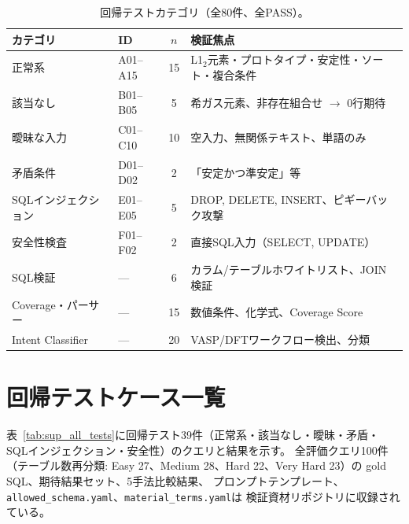 \documentclass[5p,twocolumn]{elsarticle}
\begin{document}
\begin{table}[htbp]
\centering
\caption{回帰テストカテゴリ（全80件、全PASS）。}
\label{tab:sup_test_categories}
\small
\begin{tabularx}{\textwidth}{llcX}
  \toprule
  カテゴリ & ID & $n$ & 検証焦点 \\
  \midrule
  正常系 & A01--A15 & 15 & L1$_2$元素・プロトタイプ・安定性・ソート・複合条件 \\
  該当なし & B01--B05 & 5 & 希ガス元素、非存在組合せ $\to$ 0行期待 \\
  曖昧な入力 & C01--C10 & 10 & 空入力、無関係テキスト、単語のみ \\
  矛盾条件 & D01--D02 & 2 & 「安定かつ準安定」等 \\
  SQLインジェクション & E01--E05 & 5 & DROP, DELETE, INSERT、ピギーバック攻撃 \\
  安全性検査 & F01--F02 & 2 & 直接SQL入力（SELECT, UPDATE） \\
  SQL検証 & --- & 6 & カラム/テーブルホワイトリスト、JOIN検証 \\
  Coverage・パーサー & --- & 15 & 数値条件、化学式、Coverage Score \\
  Intent Classifier & --- & 20 & VASP/DFTワークフロー検出、分類 \\
  \bottomrule
\end{tabularx}
\end{table}

\section{回帰テストケース一覧}
\label{sec:sup_all_tests}

表~\ref{tab:sup_all_tests}に回帰テスト39件（正常系・該当なし・曖昧・矛盾・
SQLインジェクション・安全性）のクエリと結果を示す。
全評価クエリ100件（テーブル数再分類: Easy 27、Medium 28、Hard 22、Very Hard 23）の
gold SQL、期待結果セット、5手法比較結果、
プロンプトテンプレート、
\texttt{allowed\_schema.yaml}、\texttt{material\_terms.yaml}は
検証資材リポジトリに収録されている。
\end{document}
